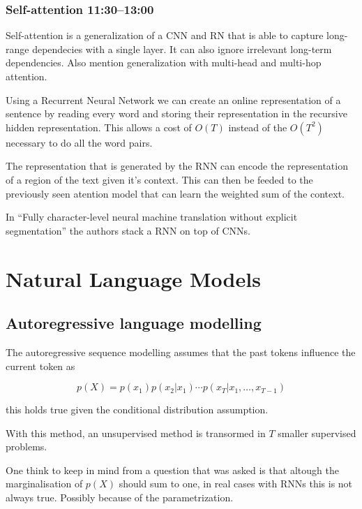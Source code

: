 \documentclass[b5paper]{report}
\begin{document}
\subsubsection{Self-attention 11:30--13:00}

Self-attention is a generalization of a CNN and RN that is able to capture
long-range dependecies with a single layer. It can also ignore irrelevant
long-term dependencies. Also mention generalization with multi-head and
multi-hop attention.

Using a Recurrent Neural Network we can create an online representation of a
sentence by reading every word and storing their representation in the
recursive hidden representation. This allows a cost of $O(T)$ instead of the
$O(T^2)$ necessary to do all the word pairs.

The representation that is generated by the RNN can encode the representation
of a region of the text given it's context. This can then be feeded to the
previously seen atention model that can learn the weighted sum of the context.

In ``Fully character-level neural machine translation without explicit
segmentation'' \cite{lee2016fully} the authors stack a RNN on top of CNNs.

\section{Natural Language Models}

\subsection{Autoregressive language modelling}

The autoregressive sequence modelling assumes that the past tokens influence
the current token as

\begin{equation}
  p(X) = p(x_1)p(x_2|x_1)\cdots p(x_T|x_1,\dots,x_{T-1})
\end{equation}

this holds true given the conditional distribution assumption.

With this method, an unsupervised method is transormed in $T$ smaller
supervised problems.

One think to keep in mind from a question that was asked is that altough the
marginalisation of $p(X)$ should sum to one, in real cases with RNNs this is
not always true. Possibly because of the parametrization.
\end{document}

